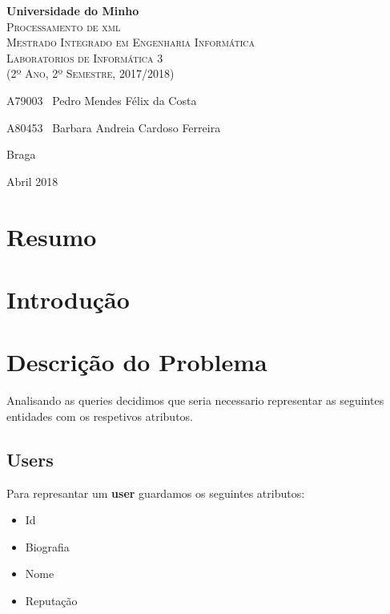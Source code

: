 \documentclass[10pt,a4paper]{report}
\begin{document}
\begin{titlepage}
    \center
    \vspace*{4.0cm}
    {\huge {\bf Universidade do Minho}}\\[0.4cm]
    \vspace{3.0cm}
    \textsc{\huge{Processamento de xml}}\\[0.5cm] %
    \vspace{3.0cm}
    \textsc{\huge{Mestrado Integrado em Engenharia Informática}}\\[0.5cm]
    \vspace{2.0cm}
    \textsc{Laboratorios de Informática 3}\\[0.5cm]
    \textsc{(2º Ano, 2º Semestre, 2017/2018)}\\[0.5cm]
    \vspace{1.5cm}
    \begin{flushleft}
        A79003 \,\,\,Pedro Mendes Félix da Costa
        \vspace{0.2cm}

        A80453 \,\,\,Barbara Andreia Cardoso Ferreira
    \end{flushleft}
        \vspace{1cm}
    \begin{flushright}
        Braga

        Abril 2018
    \end{flushright}

\end{titlepage}

\chapter{Resumo}


\tableofcontents %

\chapter{Introdução}


\chapter{Descrição do Problema}
    Analisando as queries decidimos que seria necessario representar
    as seguintes entidades com os respetivos atributos.

    \section{Users}
    Para represantar um \textbf{user} guardamos os seguintes atributos:
    \begin{itemize}
            \item Id
            \item Biografia
            \item Nome
            \item Reputação

    \end{itemize}
\end{document}

